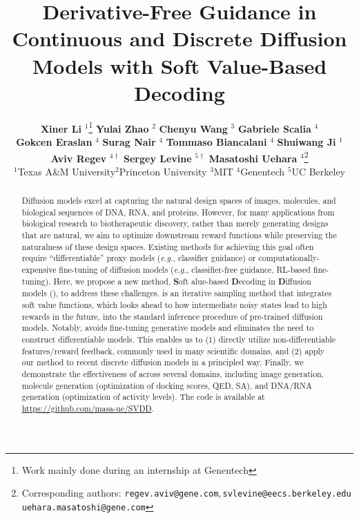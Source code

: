 \documentclass{article} %
\title{
Derivative-Free Guidance in Continuous and Discrete Diffusion Models with Soft Value-Based Decoding}
\author{%
\textbf{Xiner Li} $^{1}$\thanks{Work mainly done during an internship at Genentech} \quad \textbf{Yulai Zhao} $^{2}$ \quad \textbf{Chenyu Wang} $^{3}$ \quad \textbf{Gabriele Scalia}  $^4$   \\ 
\textbf{Gokcen Eraslan} $^4$ \textbf{Surag Nair} $^4$\,\,\textbf{Tommaso Biancalani} $^4$ \quad  \textbf{Shuiwang Ji}  $^1$ \\
\textbf{Aviv Regev} $^{4\dagger}$ \quad \textbf{Sergey Levine} $^{5\dagger}$ \quad \textbf{Masatoshi Uehara} $^{4}$\thanks{Corresponding authors: \texttt{regev.aviv@gene.com},\,\texttt{svlevine@eecs.berkeley.edu} \\ \texttt{uehara.masatoshi@gene.com}} \\   
$^1$Texas A\&M University\quad $^2$Princeton University \quad $^3$MIT  \quad $^4$Genentech \quad $^5$UC Berkeley
}
\begin{document}
\maketitle

\begin{abstract}
Diffusion models excel at capturing the natural design spaces of images, molecules, and biological sequences of DNA, RNA, and proteins. However, for many applications from biological research to biotherapeutic discovery, rather than merely generating designs that are natural, we aim to optimize downstream reward functions while preserving the naturalness of these design spaces. Existing methods for achieving this goal often require ``differentiable'' proxy models (\textit{e.g.}, classifier guidance) or computationally-expensive fine-tuning of diffusion models (\textit{e.g.}, classifier-free guidance, RL-based fine-tuning). Here, we propose a new method, \textbf{S}oft alue-based \textbf{D}ecoding in \textbf{D}iffusion models ({\alg}), to address these challenges. {\alg} is an iterative sampling method that integrates soft value functions, which looks ahead to how intermediate noisy states lead to high rewards in the future, into the standard inference procedure of pre-trained diffusion models. Notably, {\alg} avoids fine-tuning generative models and eliminates the need to construct differentiable models. This enables us to (1) directly utilize non-differentiable features/reward feedback, commonly used in many scientific domains, and (2) apply our method to recent discrete diffusion models in a principled way. Finally, we demonstrate the effectiveness of {\alg} across several domains, including image generation, molecule generation (optimization of docking scores, QED, SA), and DNA/RNA generation (optimization of activity levels).
The code is available at \href{https://github.com/masa-ue/SVDD}{https://github.com/masa-ue/SVDD}. 
\end{abstract}













\onecolumn  
\clearpage







\appendix


\end{document}
